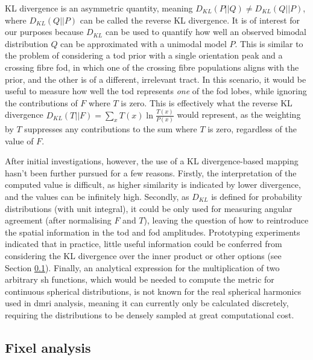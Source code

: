 KL divergence is an asymmetric quantity, meaning $D_{KL}(P||Q) \neq D_{KL}(Q||P)$, where $D_{KL}(Q||P)$ can be called the reverse KL divergence.
It is of interest for our purposes because $D_{KL}$ can be used to quantify how well an observed bimodal distribution $Q$ can be approximated with a unimodal model $P$.
This is similar to the problem of considering a \gls{tod} prior with a single orientation peak and a crossing fibre \gls{fod}, in which one of the crossing fibre populations aligns with the prior, and the other is of a different, irrelevant tract.
In this scenario, it would be useful to measure how well the \gls{tod} represents \textit{one} of the \gls{fod} lobes, while ignoring the contributions of $F$ where $T$ is zero.
This is effectively what the reverse KL divergence $D_{KL}(T||F) = \sum_x T(x) \ln \frac{T(x)}{P(x)}$ would represent, as the weighting by $T$ suppresses any contributions to the sum where $T$ is zero, regardless of the value of $F$.

After initial investigations, however, the use of a KL divergence-based mapping hasn't been further pursued for a few reasons.
Firstly, the interpretation of the computed value is difficult, as higher similarity is indicated by lower divergence, and the values can be infinitely high.
Secondly, as $D_{KL}$ is defined for probability distributions (with unit integral), it could be only used for measuring angular agreement (after normalising $F$ and $T$), leaving the question of how to reintroduce the spatial information in the \gls{tod} and \gls{fod} amplitudes.
Prototyping experiments indicated that in practice, little useful information could be conferred from considering the KL  divergence over the inner product or other options (see Section \ref{sec:fixel}).
Finally, an analytical expression for the multiplication of two arbitrary \gls{sh} functions, which would be needed to compute the metric for continuous spherical distributions, is not known for the real spherical harmonics used in \gls{dmri} analysis, meaning it can currently only be calculated discretely, requiring the distributions to be densely sampled at great computational cost.

\subsection{Fixel analysis}\label{sec:fixel}

